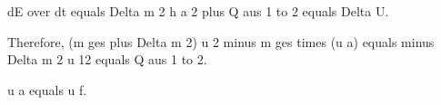 dE over dt equals Delta m 2 h a 2 plus Q aus 1 to 2 equals Delta U.

Therefore, (m ges plus Delta m 2) u 2 minus m ges times (u a) equals minus Delta m 2 u 12 equals Q aus 1 to 2.

u a equals u f.